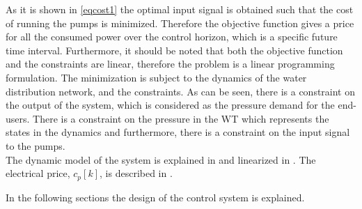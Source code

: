 As it is shown in \eqref{eqcost1} the optimal input signal is obtained such that the cost of running the pumps is minimized. Therefore the objective function gives a price for all the consumed power over the control horizon, which is a specific future time interval. Furthermore, it should be noted that both the objective function and the constraints are linear, therefore the problem is a linear programming formulation. The minimization is subject to the dynamics of the water distribution network, and the constraints. As can be seen, there is a constraint on the output of the system, which is considered as the pressure demand for the end-users. There is a constraint on the pressure in the WT which represents the states in the dynamics and furthermore, there is a constraint on the input signal to the pumps. 
\\
The dynamic model of the system is explained in  and linearized in . The electrical price, $c_p[k]$, is described in . %

In the following sections the design of the control system is explained. 







